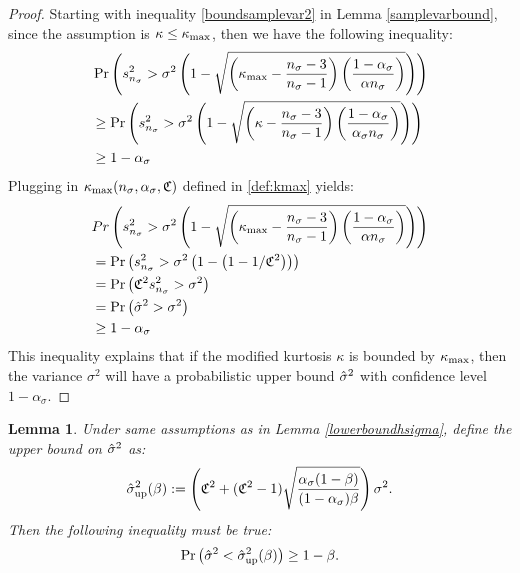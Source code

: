 \documentclass{iitthesis}
\newtheorem{lemma}[theorem]{Lemma}
\theoremstyle{definition}
\begin{document}
\begin{proof}
Starting with inequality \eqref{boundsamplevar2} in Lemma \ref{samplevarbound}, since the assumption is $\kappa \leq \kappa_{\max}$, then we have the following inequality: 
\begin{align*}
&\Pr\left( s_{n_{\sigma}}^2 > \sigma^2 \left (1-\sqrt{\left (\kappa_{\max} -\frac{n_{\sigma}-3}{n_{\sigma}-1}\right)\left (\frac{1-\alpha_{\sigma}}{\alpha n_{\sigma}}\right )}\right)\right)\\& \geq\Pr\left( s_{n_{\sigma}}^2 > \sigma^2 \left (1-\sqrt{\left (\kappa-\frac{n_{\sigma}-3}{n_{\sigma}-1}\right)\left (\frac{1-\alpha_{\sigma}}{\alpha_{\sigma} n_{\sigma}}\right )}\right)\right)\\&\geq1-\alpha_{\sigma} 
\end{align*}
 Plugging in $\kappa_{\max}(n_\sigma,\alpha_\sigma, \mathfrak{C})$ defined in \eqref{def:kmax} yields:
 \begin{align*}
&Pr\left( s_{n_{\sigma}}^2 > \sigma^2 \left (1-\sqrt{\left (\kappa_{\max} -\frac{n_{\sigma}-3}{n_{\sigma}-1}\right)\left (\frac{1-\alpha_{\sigma}}{\alpha n_{\sigma}}\right )}\right)\right)\\&
=  \Pr\left( s_{n_{\sigma}}^2 > \sigma^2 \left (1-\left(1-1/\mathfrak{C}^2\right)\right) \right) \\&
=\Pr\left(\mathfrak{C}^2s_{n_{\sigma}}^2  > \sigma^2 \right) \\&
=\Pr\left(\hat{\sigma}^2  > \sigma^2 \right) \\&
\geq  1-\alpha_{\sigma} 
\end{align*}
This inequality explains that if the modified kurtosis $\kappa$ is bounded by $\kappa_{\max}$, then the variance $\sigma^2$ will have a probabilistic upper bound $\hat{\sigma}^2$ with confidence level $1-\alpha_{\sigma}$.
\end{proof}

\begin{lemma}\label{upperboundhsigma}
Under same assumptions as in Lemma \ref{lowerboundhsigma}, define the upper bound on $\hat{\sigma}^2$ as:
\begin{align}\label{sigup}
\hat{\sigma}_{\operatorname{up}}^2 (\beta) := \left(\mathfrak{C}^2+(\mathfrak{C}^2-1)\sqrt{\frac{\alpha_{\sigma}(1-\beta)}{(1-\alpha_{\sigma})\beta}}\right)\sigma^2.
\end{align}
Then the following inequality must be true: 
\begin{align}\label{hsighsigupineq}
\Pr\left(\hat{\sigma}^2 <\hat{\sigma}_{\operatorname{up}}^2(\beta)\right) \geq 1-\beta.
\end{align}
\end{lemma}
\end{document}
